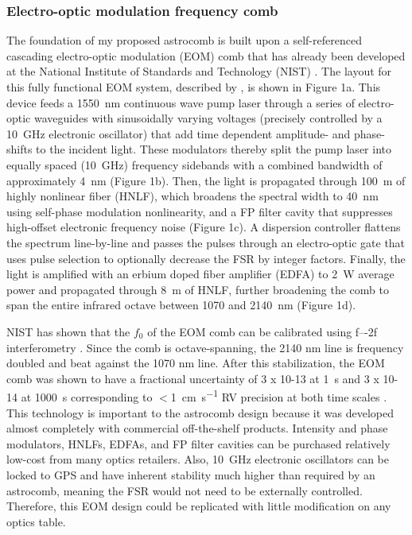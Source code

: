 \documentclass[11pt]{article}
\begin{document}
\subsubsection{Electro-optic modulation frequency comb}

The foundation of my proposed astrocomb is built upon a self-referenced cascading electro-optic modulation (EOM) comb that has already been developed at the National Institute of Standards and Technology (NIST) \citep{Cole2015, Beha2017, Carlson2017a}. The layout for this fully functional EOM system, described by \citep{Cole2015}, is shown in Figure 1a. This device feeds a \SI{1550}{\nano\meter} continuous wave pump laser through a series of electro-optic waveguides with sinusoidally varying voltages (precisely controlled by a \SI{10}{\giga\hertz} electronic oscillator) that add time dependent amplitude- and phase-shifts to the incident light. These modulators thereby split the pump laser into equally spaced (\SI{10}{\giga\hertz}) frequency sidebands with a combined bandwidth of approximately \SI{4}{\nano\meter} (Figure 1b). Then, the light is propagated through \SI{100}{\meter} of highly nonlinear fiber (HNLF), which broadens the spectral width to \SI{40}{\nano\meter} using self-phase modulation nonlinearity, and a FP filter cavity that suppresses high-offset electronic frequency noise (Figure 1c). A dispersion controller flattens the spectrum line-by-line and passes the pulses through an electro-optic gate that uses pulse selection to optionally decrease the FSR by integer factors. Finally, the light is amplified with an erbium doped fiber amplifier (EDFA) to \SI{2}{\watt} average power and propagated through \SI{8}{\meter} of HNLF, further broadening the comb to span the entire infrared octave between 1070 and \SI{2140}{\nano\meter} (Figure 1d).

NIST has shown that the $f_0$ of the EOM comb can be calibrated using f–-2f interferometry \citep{Beha2017}. Since the comb is octave-spanning, the 2140 nm line is frequency doubled and beat against the 1070 nm line. After this stabilization, the EOM comb was shown to have a fractional uncertainty of 3 x 10-13 at \SI{1}{\second} and 3 x 10-14 at \SI{1000}{\second} corresponding to $<$\SI{1}{\centi\meter\per\second} RV precision at both time scales \citep{Beha2017}. This technology is important to the astrocomb design because it was developed almost completely with commercial off-the-shelf products. Intensity and phase modulators, HNLFs, EDFAs, and FP filter cavities can be purchased relatively low-cost from many optics retailers. Also, \SI{10}{\giga\hertz} electronic oscillators can be locked to GPS and have inherent stability much higher than required by an astrocomb, meaning the FSR would not need to be externally controlled. Therefore, this EOM design could be replicated with little modification on any optics table.
\end{document}
